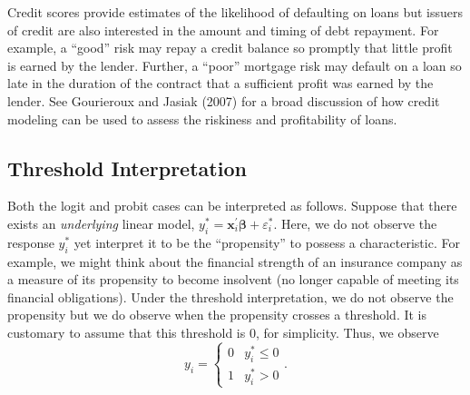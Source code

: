 
Credit scores provide estimates of the likelihood of defaulting on
loans but issuers of credit are also interested in the amount and
timing of debt repayment. For example, a ``good'' risk may repay a
credit balance so promptly that little profit is earned by the
lender. Further, a ``poor'' mortgage risk may default on a loan so
late in the duration of the contract that a sufficient profit was
earned by the lender. See Gourieroux and Jasiak (2007) for a broad
discussion of how credit modeling can be used to assess the
riskiness and profitability of loans.

\linejed

\subsection{Threshold Interpretation}\label{S11:Threshold}

Both the logit and probit cases can be interpreted as follows.
Suppose that there exists an \emph{underlying} linear model,
$y_i^{\ast} = \mathbf{x}_i^{\mathbf{\prime}}\boldsymbol \beta
 + \varepsilon_i^{\ast}$. Here, we do not observe the response
$y_i^{\ast}$ yet interpret it to be the ``propensity'' to possess a
characteristic. For example, we might think about the financial
strength of an insurance company as a measure of its propensity to
become insolvent (no longer capable of meeting its financial
obligations). Under the threshold interpretation, we do not observe
the propensity but we do observe when the propensity crosses a
threshold. It is customary to assume that this threshold is 0, for
simplicity. Thus, we observe
\begin{equation*}
y_i=\left\{
\begin{array}{ll}
0 & y_i^{\ast}\leq 0 \\
1 & y_i^{\ast}>0
\end{array}
\right. .
\end{equation*}


